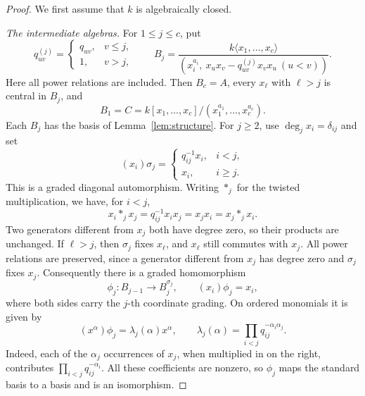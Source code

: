 \documentclass[10pt,a4paper]{amsart}
\numberwithin{equation}{section}
\begin{document}
\begin{proof}
We first assume that \(k\) is algebraically closed.

\smallskip\noindent
\emph{The intermediate algebras.}
For \(1\leq j\leq c\), put
\begin{equation*}
 q_{uv}^{(j)}=
 \begin{cases}q_{uv},&v\leq j,\\1,&v>j,\end{cases}
 \qquad
 B_j=\frac{k\langle x_1,\ldots,x_c\rangle}
 {(x_i^{a_i},\ x_ux_v-q_{uv}^{(j)}x_vx_u\ (u<v))}.
\end{equation*}
Here all power relations are included. Then \(B_c=A\), every
\(x_\ell\) with \(\ell>j\) is central in \(B_j\), and
\[
 B_1=C=k[x_1,\ldots,x_c]/(x_1^{a_1},\ldots,x_c^{a_c}).
\]
Each \(B_j\) has the basis of Lemma~\ref{lem:structure}.
For \(j\geq2\), use \(\deg_jx_i=\delta_{ij}\) and set
\begin{equation*}
 (x_i)\sigma_j=
 \begin{cases}q_{ij}^{-1}x_i,&i<j,\\x_i,&i\geq j.\end{cases}
\end{equation*}
This is a graded diagonal automorphism. Writing \(*_j\) for the
twisted multiplication, we have, for \(i<j\),
\begin{equation*}
 x_i*_jx_j=q_{ij}^{-1}x_ix_j=x_jx_i=x_j*_jx_i.
\end{equation*}
Two generators different from \(x_j\) both have degree zero, so their
products are unchanged. If \(\ell>j\), then \(\sigma_j\) fixes
\(x_\ell\), and \(x_\ell\) still commutes with \(x_j\).
All power relations are preserved, since a generator different from
\(x_j\) has degree zero and \(\sigma_j\) fixes \(x_j\).
Consequently there is a graded homomorphism
\begin{equation*}
 \phi_j:B_{j-1}\longrightarrow B_j^{\sigma_j},\qquad
 (x_i)\phi_j=x_i,
\end{equation*}
where both sides carry the \(j\)-th coordinate grading. On ordered
monomials it is given by
\begin{equation*}
 (x^\alpha)\phi_j=\lambda_j(\alpha)x^\alpha,
 \qquad \lambda_j(\alpha)=\prod_{i<j}q_{ij}^{-\alpha_i\alpha_j}.
\end{equation*}
Indeed, each of the \(\alpha_j\) occurrences of \(x_j\), when multiplied
in on the right, contributes \(\prod_{i<j}q_{ij}^{-\alpha_i}\).
All these coefficients are nonzero, so \(\phi_j\) maps the standard
basis to a basis and is an isomorphism.


\end{proof}
\end{document}
